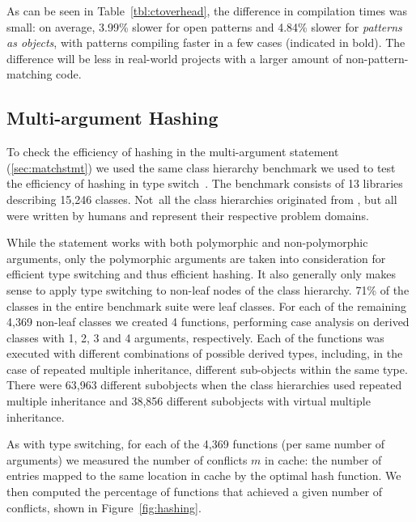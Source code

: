 As can be seen in Table~\ref{tbl:ctoverhead}, the difference in compilation times was small: on 
average, 3.99\% slower for open patterns and 4.84\% slower for \emph{patterns as objects}, with 
patterns compiling faster in a few cases (indicated in bold). The difference will be less
in real-world projects with a larger amount of non-pattern-matching code.

\subsection{Multi-argument Hashing}
\label{sec:morton}

To check the efficiency of hashing in the multi-argument  statement 
(\textsection\ref{sec:matchstmt}) we used the same class hierarchy benchmark we 
used to test the efficiency of hashing in type switch~\cite[]{TS12}.
The benchmark consists of 13 libraries describing 15,246 classes. Not~all 
the class hierarchies originated from \Cpp{}, but all were written by humans and 
represent their respective problem domains.

While the  statement works with both polymorphic and non-polymorphic 
arguments, only the polymorphic arguments are taken into consideration for 
efficient type switching and thus efficient hashing. It also generally only makes 
sense to apply type switching to non-leaf nodes of the class hierarchy. 71\%
of the classes in the entire benchmark suite were leaf classes. For each of the 
remaining 4,369 non-leaf classes we created 4 functions, performing case analysis 
on derived classes with 1, 2, 3 and 4 arguments, respectively. Each 
of the functions was executed with different combinations of possible derived 
types, including, in the case of repeated multiple inheritance, different 
sub-objects within the same type. There were 63,963 different subobjects when the 
class hierarchies used repeated multiple inheritance and 38,856 different 
subobjects with virtual multiple inheritance.

As with type switching, for each of the 4,369 functions (per same number of 
arguments) we measured the number of conflicts $m$ in cache: the number 
of entries mapped to the same location in cache by the optimal hash function. 
We then computed the percentage of functions that achieved a given number of 
conflicts, shown in Figure~\ref{fig:hashing}.

